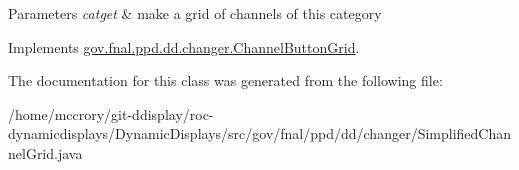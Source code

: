 \begin{DoxyParams}{Parameters}
{\em catget} & make a grid of channels of this category \\
\hline
\end{DoxyParams}


Implements \hyperlink{classgov_1_1fnal_1_1ppd_1_1dd_1_1changer_1_1ChannelButtonGrid_a5acf39593b87514d5015b219e91ddeac}{gov.\-fnal.\-ppd.\-dd.\-changer.\-Channel\-Button\-Grid}.



The documentation for this class was generated from the following file\-:\begin{DoxyCompactItemize}
\item 
/home/mccrory/git-\/ddisplay/roc-\/dynamicdisplays/\-Dynamic\-Displays/src/gov/fnal/ppd/dd/changer/Simplified\-Channel\-Grid.\-java\end{DoxyCompactItemize}
